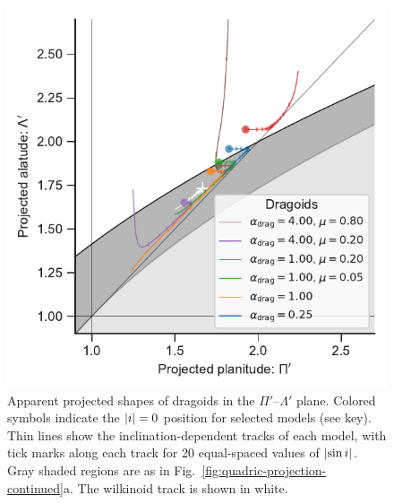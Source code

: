 \begin{figure}
  \centering
  \includegraphics[width=\linewidth]{figs/dragoid-R90-vs-Rc}
  \caption{Apparent projected shapes of dragoids in the
    \(\Pi'\)--\(\Lambda'\) plane. Colored symbols indicate the
    \(\lvert i\rvert = 0\) position for selected models (see key).  Thin
    lines show the inclination-dependent tracks of each model, with
    tick marks along each track for 20 equal-spaced values of
    \(\lvert\sin i\rvert\). Gray shaded regions are as in
    Fig.~\ref{fig:quadric-projection-continued}a.  The wilkinoid track
    is shown in white. }
  \label{fig:dragoid-Rc-R90}
\end{figure}

